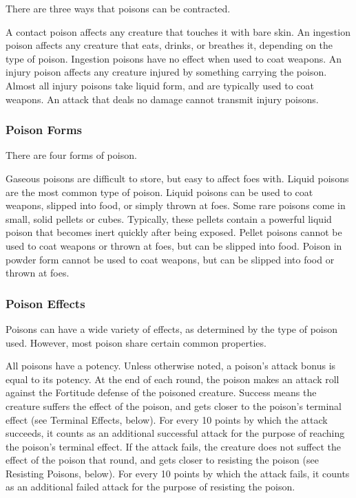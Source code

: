 There are three ways that poisons can be contracted.

 A contact poison affects any creature that touches it with bare skin.
 An ingestion poison affects any creature that eats, drinks, or breathes it, depending on the type of poison.
Ingestion poisons have no effect when used to coat weapons.
 An injury poison affects any creature injured by something carrying the poison.
Almost all injury poisons take liquid form, and are typically used to coat weapons.
An attack that deals no damage cannot transmit injury poisons.

\subsubsection{Poison Forms}\label{Poison Forms}

There are four forms of poison.

 Gaseous poisons are difficult to store, but easy to affect foes with.
 Liquid poisons are the most common type of poison.
Liquid poisons can be used to coat weapons, slipped into food, or simply thrown at foes.
 Some rare poisons come in small, solid pellets or cubes.
Typically, these pellets contain a powerful liquid poison that becomes inert quickly after being exposed.
Pellet poisons cannot be used to coat weapons or thrown at foes, but can be slipped into food.
 Poison in powder form cannot be used to coat weapons, but can be slipped into food or thrown at foes.

\subsubsection{Poison Effects}\label{Poison Effects}

Poisons can have a wide variety of effects, as determined by the type of poison used.
However, most poison share certain common properties.

\label{Potency}\label{Poison Potency}
All poisons have a potency.
Unless otherwise noted, a poison's attack bonus is equal to its potency.
At the end of each round, the poison makes an attack roll against the Fortitude defense of the poisoned creature.
Success means the creature suffers the effect of the poison, and gets closer to the poison's terminal effect (see Terminal Effects, below).
For every 10 points by which the attack succeeds, it counts as an additional successful attack for the purpose of reaching the poison's terminal effect.
If the attack fails, the creature does not suffect the effect of the poison that round, and gets closer to resisting the poison (see Resisting Poisons, below).
For every 10 points by which the attack fails, it counts as an additional failed attack for the purpose of resisting the poison.

